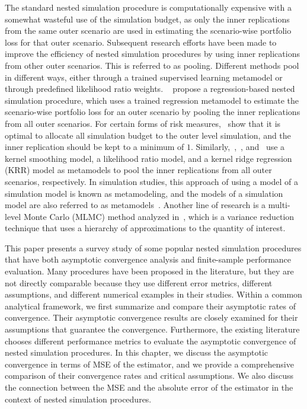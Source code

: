 The standard nested simulation procedure is computationally expensive with a somewhat wasteful use of the simulation budget, as only the inner replications from the same outer scenario are used in estimating the scenario-wise portfolio loss for that outer scenario.
Subsequent research efforts have been made to improve the efficiency of nested simulation procedures by using inner replications from other outer scenarios.
This is referred to as pooling.
Different methods pool in different ways, either through a trained supervised learning metamodel or through predefined likelihood ratio weights.
~\cite{broadie2015risk} propose a regression-based nested simulation procedure, which uses a trained regression metamodel to estimate the scenario-wise portfolio loss for an outer scenario by pooling the inner replications from all outer scenarios.
For certain forms of risk measures,~\cite{broadie2015risk} show that it is optimal to allocate all simulation budget to the outer level simulation, and the inner replication should be kept to a minimum of $1$.
Similarly,~\cite{hong2017kernel},~\cite{feng2020optimal}, and~\cite{zhang2022sample} use a kernel smoothing model, a likelihood ratio model, and a kernel ridge regression (KRR) model as metamodels to pool the inner replications from all outer scenarios, respectively.
In simulation studies, this approach of using a model of a simulation model is known as metamodeling, and the models of a simulation model are also referred to as metamodels~\citep{barton1998simulation}.
Another line of research is a multi-level Monte Carlo (MLMC) method analyzed in~\cite{giles2019multilevel}, which is a variance reduction technique that uses a hierarchy of approximations to the quantity of interest.

This paper presents a survey study of some popular nested simulation procedures that have both asymptotic convergence analysis and finite-sample performance evaluation.
Many procedures have been proposed in the literature, but they are not directly comparable because they use different error metrics, different assumptions, and different numerical examples in their studies.
Within a common analytical framework, we first summarize and compare their asymptotic rates of convergence.
Their asymptotic convergence results are closely examined for their assumptions that guarantee the convergence.
Furthermore, the existing literature chooses different performance metrics to evaluate the asymptotic convergence of nested simulation procedures.
In this chapter, we discuss the asymptotic convergence in terms of MSE of the estimator, and we provide a comprehensive comparison of their convergence rates and critical assumptions.
We also discuss the connection between the MSE and the absolute error of the estimator in the context of nested simulation procedures.


